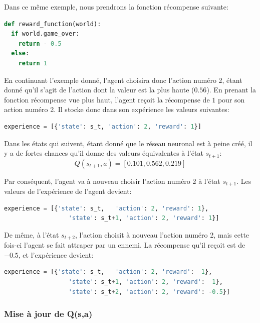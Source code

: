 \documentclass[11pt,a4paper]{report}
\begin{document}
  \par Dans ce même exemple, nous prendrons la fonction récompense suivante: 
  
  \begin{lstlisting}[language=python]
def reward_function(world):
  if world.game_over:
    return - 0.5
  else:
    return 1
  \end{lstlisting} 
  
  \par En continuant l'exemple donné, l'agent choisira donc l'action numéro 2, étant donné qu'il s'agit de l'action dont la valeur est la plus haute ($0.56$). En prenant la fonction récompense vue plus haut, l'agent reçoit la récompense de $1$ pour son action numéro 2. Il stocke donc dans son expérience les valeurs suivantes: 
  
  \begin{lstlisting}[language=python]
   experience = [{'state': s_t, 'action': 2, 'reward': 1}]
  \end{lstlisting}
  
  \par Dans les états qui suivent, étant donné que le réseau neuronal est à peine créé, il y a de fortes chances qu'il donne des valeurs équivalentes à l'état $s_{t+1}$: 
  $$Q(s_{t+1}, a) = [0.101, 0.562, 0.219]$$
  
  
  \par Par conséquent, l'agent va à nouveau choisir l'action numéro 2 à l'état $s_{t+1}$. Les valeurs de l'expérience de l'agent devient: 

  \begin{lstlisting}[language=python]
   experience = [{'state': s_t,   'action': 2, 'reward': 1},
                  'state': s_t+1, 'action': 2, 'reward': 1}]
  \end{lstlisting}  
  
  \par De même, à l'état $s_{t+2}$, l'action choisit à nouveau l'action numéro 2, mais cette fois-ci l'agent se fait attraper par un ennemi. La récompense qu'il reçoit est de $-0.5$, et l’expérience devient: 
  
  \begin{lstlisting}[language=python]
   experience = [{'state': s_t,   'action': 2, 'reward':  1},
                  'state': s_t+1, 'action': 2, 'reward':  1},
                  'state': s_t+2, 'action': 2, 'reward': -0.5}]
  \end{lstlisting}    
  
  \subsubsection{Mise à jour de Q(s,a)}
  
\end{document}
